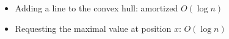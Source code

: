 \begin{itemize}
	\item Adding a line to the convex hull: amortized $O(\log{n})$
  \item Requesting the maximal value at position $x$: $O(\log{n})$
\end{itemize}
